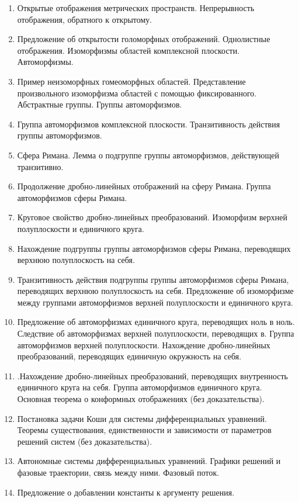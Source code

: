 \documentclass[a4paper,10pt]{article}
\begin{document}
\begin{enumerate}
  \item Открытые отображения метрических пространств.
        Непрерывность отображения, обратного к открытому.
  \item Предложение об открытости голоморфных отображений.
        Однолистные отображения.
        Изоморфизмы областей комплексной плоскости.
        Автоморфизмы.
  \item Пример неизоморфных гомеоморфных областей.
        Представление произвольного изоморфизма областей с помощью фиксированного.
        Абстрактные группы.
        Группы автоморфизмов.
  \item Группа автоморфизмов комплексной плоскости.
        Транзитивность действия группы автоморфизмов.
  \item Сфера Римана.
        Лемма о подгруппе группы автоморфизмов, действующей транзитивно.
  \item Продолжение дробно-линейных отображений на сферу Римана.
        Группа автоморфизмов сферы Римана.
  \item Круговое свойство дробно-линейных преобразований.
        Изоморфизм верхней полуплоскости и единичного круга.
  \item Нахождение подгруппы группы автоморфизмов сферы Римана, переводящих верхнюю полуплоскость на себя.
  \item Транзитивность действия подгруппы группы автоморфизмов сферы Римана, переводящих верхнюю полуплоскость на себя.
        Предложение об изоморфизме между группами автоморфизмов верхней полуплоскости и единичного круга.
  \item Предложение об автоморфизмах единичного круга, переводящих ноль в ноль.
        Следствие об автоморфизмах верхней полуплоскости, переводящих в.
        Группа автоморфизмов верхней полуплоскости.
        Нахождение дробно-линейных преобразований, переводящих единичную окружность на себя.
  \item .Нахождение дробно-линейных преобразований, переводящих внутренность единичного круга на себя.
        Группа автоморфизмов единичного круга.
        Основная теорема о конформных отображениях (без доказательства).
  \item Постановка задачи Коши для системы дифференциальных уравнений.
        Теоремы существования, единственности и зависимости от параметров решений систем (без доказательства).
  \item Автономные системы дифференциальных уравнений.
        Графики решений и фазовые траектории, связь между ними.
        Фазовый поток.
  \item Предложение о добавлении константы к аргументу решения.

\end{enumerate}
\end{document}
